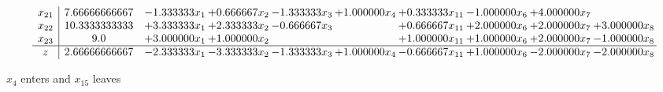 \documentclass[10pt]{article}
\begin{document}
\[\begin{array}{c| c c@{\hskip 2pt} c@{\hskip 2pt} c@{\hskip 2pt} c@{\hskip 2pt} c@{\hskip 2pt} c@{\hskip 2pt} c@{\hskip 2pt} c@{\hskip 2pt} }
 x_{21}   &  7.66666666667 & -1.333333 x_{1} & + 0.666667 x_{2} & -1.333333 x_{3} & + 1.000000 x_{4} & + 0.333333 x_{11} & -1.000000 x_{6} & + 4.000000 x_{7} &   \\
 x_{22}   &  10.3333333333 & + 3.333333 x_{1} & + 2.333333 x_{2} & -0.666667 x_{3} &   & + 0.666667 x_{11} & + 2.000000 x_{6} & + 2.000000 x_{7} & + 3.000000 x_{8}\\
 x_{23}   &  9.0 & + 3.000000 x_{1} & + 1.000000 x_{2} &    &   & + 1.000000 x_{11} & + 1.000000 x_{6} & + 2.000000 x_{7} & -1.000000 x_{8}\\
\hline
z    &  2.66666666667 & -2.333333 x_{1} & -3.333333 x_{2} & -1.333333 x_{3} & + 1.000000 x_{4} & -0.666667 x_{11} & + 1.000000 x_{6} & -2.000000 x_{7} & -2.000000 x_{8}\\
\end{array}\]


 $ x_{4} $ enters and $ x_{15} $ leaves 
\end{document}
